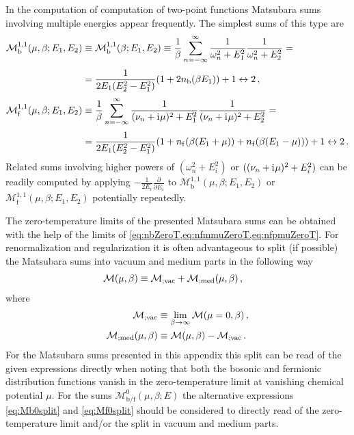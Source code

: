 In the computation of computation of two-point functions Matsubara sums involving multiple energies appear frequently. The simplest sums of this type are
\begin{align}
	\mathcal{M}_\mathrm{b}^{1,1}(\mu,\beta;E_1,E_2)&\equiv\mathcal{M}_\mathrm{b}^{1,1}(\beta;E_1,E_2)\equiv \frac{1}{\beta}\sum_{n=-\infty}^{\infty}\frac{1}{\omega_n^2+E_1^2}\frac{1}{\omega_n^2+E_2^2}=\notag\\[.25em]
	&= \frac{1}{2E_1(E_2^2-E_1^2)}(1+2n_\mathrm{b}(\beta E_1))+ 1\leftrightarrow2 \, , \label{eq:Mb11}\\[.25em]
	\mathcal{M}_\mathrm{f}^{1,1}(\mu,\beta;E_1,E_2)&\equiv \frac{1}{\beta}\sum_{n=-\infty}^{\infty}\frac{1}{(\nu_n+\mathrm{i}\mkern1mu\mu)^2+E_1^2}\frac{1}{(\nu_n+\mathrm{i}\mkern1mu\mu)^2+E_2^2}=\notag\\[.25em]
	&= \frac{1}{2E_1(E_2^2-E_1^2)}(1+n_\mathrm{f}(\beta (E_1+\mu))+n_\mathrm{f}(\beta (E_1-\mu)))+ 1\leftrightarrow2 \, . \label{eq:Mf11}
\end{align}
Related sums involving higher powers of $(\omega_n^2+E_i^2)$ or $((\nu_n+\mathrm{i}\mkern1mu\mu)^2+E_i^2)$ can be readily computed by applying $-\tfrac{1}{2E_i}\tfrac{\partial}{\partial E_i}$ to $\mathcal{M}_\mathrm{b}^{1,1}(\mu,\beta;E_1,E_2)$ or $\mathcal{M}_\mathrm{f}^{1,1}(\mu,\beta;E_1,E_2)$ potentially repeatedly.

The zero-temperature limits of the presented Matsubara sums can be obtained with the help of the limits of \cref{eq:nbZeroT,eq:nfmmuZeroT,eq:nfpmuZeroT}.
For renormalization and regularization it is often advantageous to split (if possible) the Matsubara sums into vacuum and medium parts in the following way
\begin{align}
	\mathcal{M}(\mu,\beta)&\equiv \mathcal{M}_{;\mathrm{vac}} +\mathcal{M}_{;\mathrm{med}}(\mu,\beta)\, ,
\end{align}
where 
\begin{align}
	\mathcal{M}_{;\mathrm{vac}} &\equiv \lim_{\beta \rightarrow \infty } \mathcal{M}(\mu=0,\beta)\, ,\\
	\mathcal{M}_{;\mathrm{med}}(\mu,\beta) &\equiv \mathcal{M}(\mu,\beta) - \mathcal{M}_{;\mathrm{vac}} \, .
\end{align}
For the Matsubara sums presented in this appendix this split can be read of the given expressions directly when noting that both the bosonic and fermionic distribution functions vanish in the zero-temperature limit at vanishing chemical potential $\mu$. For the sums $\mathcal{M}_\mathrm{b/f}^0(\mu,\beta;E)$ the alternative expressions \eqref{eq:Mb0split} and \eqref{eq:Mf0split} should be considered to directly read of the zero-temperature limit and/or the split in vacuum and medium parts.

